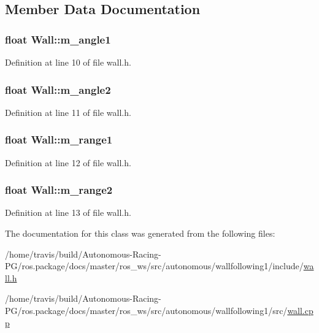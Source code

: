 \subsection{Member Data Documentation}
\subsubsection[{\texorpdfstring{m\+\_\+angle1}{m_angle1}}]{\setlength{\rightskip}{0pt plus 5cm}float Wall\+::m\+\_\+angle1}\hypertarget{class_wall_aa55464f62abb57889a95936563a20671}{}\label{class_wall_aa55464f62abb57889a95936563a20671}


Definition at line 10 of file wall.\+h.

\subsubsection[{\texorpdfstring{m\+\_\+angle2}{m_angle2}}]{\setlength{\rightskip}{0pt plus 5cm}float Wall\+::m\+\_\+angle2}\hypertarget{class_wall_a1acb9bc37500a68c08db14c3659c3cd0}{}\label{class_wall_a1acb9bc37500a68c08db14c3659c3cd0}


Definition at line 11 of file wall.\+h.

\subsubsection[{\texorpdfstring{m\+\_\+range1}{m_range1}}]{\setlength{\rightskip}{0pt plus 5cm}float Wall\+::m\+\_\+range1}\hypertarget{class_wall_a56b11c6748405e939de7cf4f9fabdc2d}{}\label{class_wall_a56b11c6748405e939de7cf4f9fabdc2d}


Definition at line 12 of file wall.\+h.

\subsubsection[{\texorpdfstring{m\+\_\+range2}{m_range2}}]{\setlength{\rightskip}{0pt plus 5cm}float Wall\+::m\+\_\+range2}\hypertarget{class_wall_aeb7c600e6e41792c60498ca310c833f1}{}\label{class_wall_aeb7c600e6e41792c60498ca310c833f1}


Definition at line 13 of file wall.\+h.



The documentation for this class was generated from the following files\+:\begin{DoxyCompactItemize}
\item 
/home/travis/build/\+Autonomous-\/\+Racing-\/\+P\+G/ros.\+package/docs/master/ros\+\_\+ws/src/autonomous/wallfollowing1/include/\hyperlink{wall_8h}{wall.\+h}\item 
/home/travis/build/\+Autonomous-\/\+Racing-\/\+P\+G/ros.\+package/docs/master/ros\+\_\+ws/src/autonomous/wallfollowing1/src/\hyperlink{wall_8cpp}{wall.\+cpp}\end{DoxyCompactItemize}
